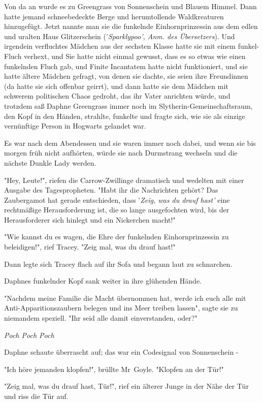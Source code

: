 {Von da an wurde es zu Greengrass von Sonnenschein und Blauem Himmel. Dann hatte jemand schneebedeckte Berge und herumtollende Waldkreaturen hinzugefügt. Jetzt nannte man sie die funkelnde Einhornprinzessin aus dem edlen und uralten Haus Glitzerschein ('\emph{Sparklypoo', Anm. des Übersetzers}). Und irgendein verfluchtes Mädchen aus der sechsten Klasse hatte sie mit einem funkel-Fluch verhext, und Sie hatte nicht einmal gewusst, dass es so etwas wie einen funkelnden Fluch gab, und Finite Incantatem hatte nicht funktioniert, und sie hatte ältere Mädchen gefragt, von denen sie dachte, sie seien ihre Freundinnen (da hatte sie sich offenbar geirrt), und dann hatte sie dem Mädchen mit schwerem politischen Chaos gedroht, das ihr Vater anrichten würde, und trotzdem saß Daphne Greengrass immer noch im Slytherin-Gemeinschaftsraum, den Kopf in den Händen, strahlte, funkelte und fragte sich, wie sie als einzige vernünftige Person in Hogwarts gelandet war.

Es war nach dem Abendessen und sie waren immer noch dabei, und wenn sie bis morgen früh nicht aufhörten, würde sie nach Durmstrang wechseln und die nächste Dunkle Lady werden.

"Hey, Leute!", riefen die Carrow-Zwillinge dramatisch und wedelten mit einer Ausgabe des Tagespropheten. "Habt ihr die Nachrichten gehört? Das Zaubergamot hat gerade entschieden, dass '\emph{Zeig, was du drauf hast'} eine rechtmäßige Herausforderung ist, die so lange ausgefochten wird, bis der Herausforderer sich hinlegt und ein Nickerchen macht!"

"Wie kannst du es wagen, die Ehre der funkelnden Einhornprinzessin zu beleidigen!", rief Tracey. "Zeig mal, was du drauf hast!"

Dann legte sich Tracey flach auf ihr Sofa und begann laut zu schnarchen.

Daphnes funkelnder Kopf sank weiter in ihre glühenden Hände.

"Nachdem meine Familie die Macht übernommen hat, werde ich euch alle mit Anti-Apparitionszaubern belegen und ins Meer treiben lassen", sagte sie zu niemandem speziell. "Ihr seid alle damit einverstanden, oder?"

\emph{Poch Poch Poch}

Daphne schaute überrascht auf; das war ein Codesignal von Sonnenschein -

"Ich höre jemanden klopfen!", brüllte Mr~Goyle. "Klopfen an der Tür!"

"Zeig mal, was du drauf hast, Tür!", rief ein älterer Junge in der Nähe der Tür und riss die Tür auf.

}
